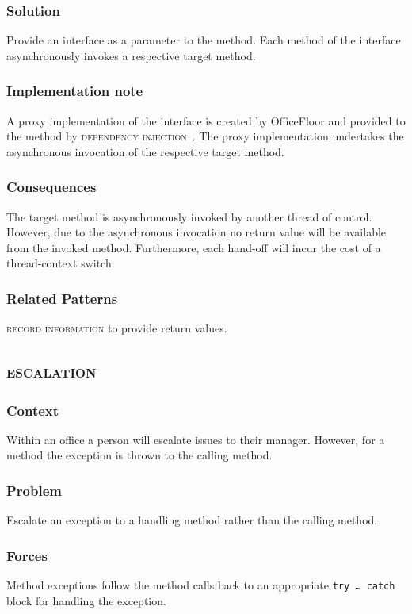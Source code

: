 \documentclass[prodmode]{style/acmlarge}
\begin{document}
\subsubsection*{Solution}  Provide an interface as a parameter to the method.
Each method of the interface asynchronously invokes a respective target method.

\subsubsection*{Implementation note} A proxy implementation of the interface is
created by OfficeFloor and provided to the method by \textsc{dependency
injection}~\cite{ioc}.  The proxy implementation undertakes the asynchronous
invocation of the respective target method.

\subsubsection*{Consequences} The target method is asynchronously invoked by
another thread of control.  However, due to the asynchronous invocation no
return value will be available from the invoked method.  Furthermore, each
hand-off will incur the cost of a thread-context switch.

\subsubsection*{Related Patterns} \textsc{record information} to provide return
values.



\subsection{\textsc{\textbf{escalation}}}

\subsubsection*{Context} Within an office a person will escalate issues to their
manager.  However, for a method the exception is thrown to the calling method.

\subsubsection*{Problem} Escalate an exception to a handling method rather than
the calling method.

\subsubsection*{Forces} Method exceptions follow the method calls back to an
appropriate \texttt{try~\ldots~catch} block for handling the exception.
\end{document}
